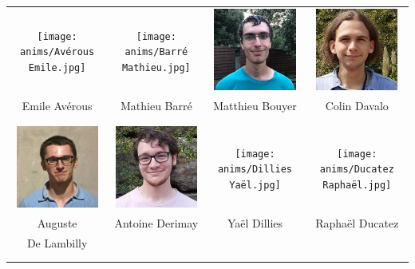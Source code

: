 

\vspace{2mm}
\begin{center}
\begin{tabular}{cccc}
\texttt{[image: anims/Avérous Emile.jpg]} &
\texttt{[image: anims/Barré Mathieu.jpg]} &
\includegraphics[angle=0,origin=c, width=27mm]{anims/Bouyer Matthieu.jpg} &
\includegraphics[angle=0,origin=c, width=27mm]{anims/Davalo Colin.jpg} \\
Emile Avérous & Mathieu Barré & Matthieu Bouyer & Colin Davalo \\ \\ \\

\includegraphics[angle=0,origin=c, width=27mm]{anims/De Lambilly Auguste.JPG} &
\includegraphics[angle=0,origin=c, width=27mm]{anims/Derimay Antoine.jpg} &
\texttt{[image: anims/Dillies Yaël.jpg]} &
\texttt{[image: anims/Ducatez Raphaël.jpg]} \\
Auguste & Antoine Derimay & Yaël Dillies & Raphaël Ducatez \\ De Lambilly & & & \\ \\ \\


\end{tabular}
\end{center}
